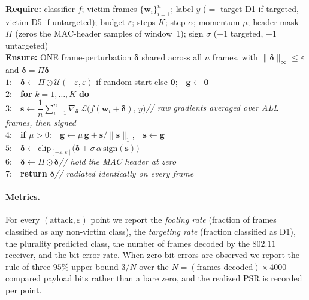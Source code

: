 \documentclass[11pt]{article}
\begin{document}
\begin{algorithm}[t]
\caption{Universal masked $\ell_\infty$ perturbation crafting}\label{alg:uni}
{\small\setlength{\parindent}{0pt}%
\textbf{Require:} classifier $f$; victim frames $\{\mathbf w_i\}_{i=1}^{n}$; label $y$ ($=$ target
D1 if targeted, victim D5 if untargeted); budget $\varepsilon$; steps $K$; step $\alpha$;
momentum $\mu$; header mask $\Pi$ (zeros the MAC-header samples of window~1); sign $\sigma$
($-1$ targeted, $+1$ untargeted)\\
\textbf{Ensure:} ONE frame-perturbation $\boldsymbol\delta$ shared across all $n$ frames, with
$\lVert\boldsymbol\delta\rVert_\infty\le\varepsilon$ and $\boldsymbol\delta=\Pi\boldsymbol\delta$\\[2pt]
$1$:\ \ $\boldsymbol\delta \gets \Pi\odot\mathcal U(-\varepsilon,\varepsilon)$ if random start else
$\mathbf 0$;\ \ $\mathbf g\gets\mathbf 0$\\
$2$:\ \ \textbf{for} $k=1,\dots,K$ \textbf{do}\\
$3$:\ \ \quad $\mathbf s \gets \dfrac{1}{n}\sum_{i=1}^{n}\nabla_{\boldsymbol\delta}\,\mathcal L\!\big(f(\mathbf w_i+\boldsymbol\delta),\,y\big)$\hfill{\itshape// raw gradients averaged over ALL frames, then signed}\\
$4$:\ \ \quad \textbf{if} $\mu>0$:\ \ $\mathbf g \gets \mu\,\mathbf g + \mathbf s/\lVert\mathbf s\rVert_1$,\ \ $\mathbf s \gets \mathbf g$\\
$5$:\ \ \quad $\boldsymbol\delta \gets \mathrm{clip}_{[-\varepsilon,\varepsilon]}\!\big(\boldsymbol\delta + \sigma\,\alpha\,\mathrm{sign}(\mathbf s)\big)$\\
$6$:\ \ \quad $\boldsymbol\delta \gets \Pi\odot\boldsymbol\delta$\hfill{\itshape// hold the MAC header at zero}\\
$7$:\ \ \textbf{return} $\boldsymbol\delta$\hfill{\itshape// radiated identically on every frame}\par}
\end{algorithm}

\paragraph{Metrics.} For every $(\text{attack},\varepsilon)$ point we report the \emph{fooling
rate} (fraction of frames classified as any non-victim class), the \emph{targeting rate} (fraction
classified as D1), the plurality predicted class, the number of frames decoded by the $802.11$
receiver, and the bit-error rate. When zero bit errors are observed we report the rule-of-three
$95\%$ upper bound $3/N$ over the $N=(\text{frames decoded})\times4000$ compared payload bits
rather than a bare zero, and the realized PSR is recorded per point.
\end{document}

